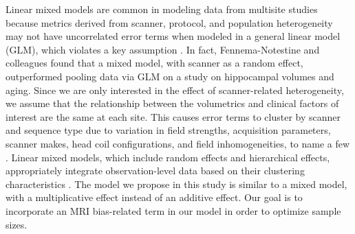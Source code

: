 Linear mixed models are common in modeling data from multisite studies because metrics derived from scanner, protocol, and population heterogeneity may not have uncorrelated error terms when modeled in a general linear model (GLM), which violates a key assumption \cite{garson2013fundamentals}. In fact, Fennema-Notestine and colleagues found that a mixed model, with scanner as a random effect, outperformed pooling data via GLM\cite{fennema2007feasibility} on a study on hippocampal volumes and aging. Since we are only interested in the effect of scanner-related heterogeneity, we assume that the relationship between the volumetrics and clinical factors of interest are the same at each site. This causes error terms to cluster by scanner and sequence type due to variation in field strengths, acquisition parameters, scanner makes, head coil configurations, and field inhomogeneities, to name a few \cite{cannon2014}. Linear mixed models, which include random effects and hierarchical effects, appropriately integrate observation-level data based on their clustering characteristics \cite{garson2013fundamentals}. The model we propose in this study is similar to a mixed model, with a multiplicative effect instead of an additive effect. Our goal is to incorporate an MRI bias-related term in our model in order to optimize sample sizes.